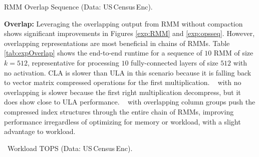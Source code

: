 \begin{table} [!t] \setlength\tabcolsep{17.4pt}
	\caption{\label{tab:expOverlap}RMM Overlap Sequence (Data: US\,Census\,Enc).}
	\vspace{-0.4cm}
	

\end{table}

\textbf{Overlap:} Leveraging the overlapping output from RMM without compaction shows significant improvements in Figures \ref{exp:RMM} and \ref{exp:opsseq}.
However, overlapping representations are most beneficial in chains of RMMs. Table \ref{tab:expOverlap} shows the end-to-end runtime for a sequence of $10$ RMM of size $k=512$, representative for processing $10$ fully-connected layers of size $512$ with no activation.
CLA is slower than ULA in this scenario because it is falling back to vector matrix compressed operations for the first multiplication.
\name~ with no overlapping is slower because the first right multiplication decompress, but it does show close to ULA performance.
\name~ with overlapping column groups push the compressed index structures through the entire chain of RMMs, improving performance irregardless of optimizing for memory or workload, with a slight advantage to workload.


\begin{table} [!b] \setlength\tabcolsep{8pt}
	\caption{ \label{tab:workload} \name \ Workload TOPS (Data: US\,Census\,Enc).}
	\vspace{-0.4cm}
	

\end{table}

